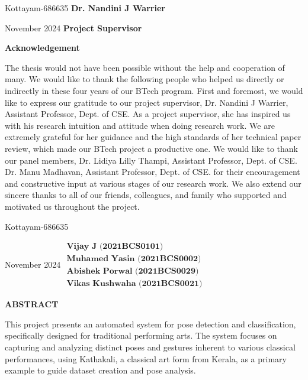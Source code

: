 \documentclass[12pt,a4wide]{report}
\theoremstyle{plain}
\theoremstyle{definition}
\theoremstyle{remark}
\begin{document}
\vspace{4cm}

\noindent Kottayam-686635  \hfill \textbf{Dr. Nandini J Warrier}

\noindent November  2024 \hfill \textbf{Project Supervisor}

\clearpage





\begin{center}
{\Large{\bf{Acknowledgement}}}
\end{center}
The thesis would not have been possible without the help and cooperation
of many. We would like to thank the following people who helped us directly
or indirectly in these four years of our BTech program.
First and foremost, we would like to express our gratitude to our project
supervisor, Dr. Nandini J Warrier, Assistant Professor, Dept. of CSE. As a
project supervisor, she has inspired us with his research intuition and attitude
when doing research work. We are extremely grateful for her guidance and
the high standards of her technical paper review, which made our BTech
project a productive one.
We would like to thank our panel members, Dr. Lidiya Lilly Thampi,
Assistant Professor, Dept. of CSE. Dr. Manu Madhavan, Assistant Professor, Dept. of CSE. for their encouragement and constructive input at various
stages of our research work.
We also extend our sincere thanks to all of our friends, colleagues, and family who supported and motivated us throughout the project.

\vspace{4cm}

\noindent Kottayam-686635 

\noindent November 2024 \hfill 
$\begin{array}{l}
    \textbf{Vijay J (2021BCS0101)} \\
    \textbf{Muhamed Yasin (2021BCS0002)} \\
    \textbf{Abishek Porwal (2021BCS0029)} \\
    \textbf{Vikas Kushwaha (2021BCS0021)}
\end{array}$

\clearpage


\begin{center}
{\Large{\bf{ABSTRACT}}}
\end{center}


This project presents an automated system for pose detection and classification, specifically designed for traditional performing arts. The system focuses on capturing and analyzing distinct poses and gestures inherent to various classical performances, using Kathakali, a classical art form from Kerala, as a primary example to guide dataset creation and pose analysis.
\end{document}
